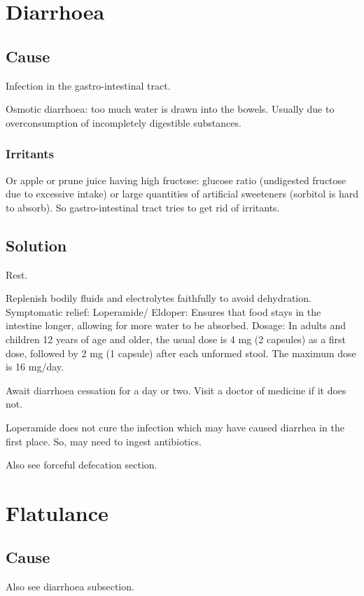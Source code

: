 \documentclass[oneside, article]{memoir}
\begin{document}
\section{Diarrhoea}
\subsection{Cause}
Infection in the gastro-intestinal tract.

Osmotic diarrhoea: too much water is drawn into the bowels. Usually due to overconsumption of incompletely digestible substances. 

\subsubsection{Irritants}
Or apple or prune juice having high fructose: glucose ratio (undigested fructose due to excessive intake) or large quantities of artificial sweeteners (sorbitol is hard to absorb). So gastro-intestinal tract tries to get rid of irritants.

\subsection{Solution}
Rest.

Replenish bodily fluids and electrolytes faithfully to avoid dehydration. Symptomatic relief: Loperamide/ Eldoper: Ensures that food stays in the intestine longer, allowing for more water to be absorbed. Dosage: In adults and children 12 years of age and older, the usual dose is 4 mg (2 capsules) as a first dose, followed by 2 mg (1 capsule) after each unformed stool. The maximum dose is 16 mg/day.

Await diarrhoea cessation for a day or two. Visit a doctor of medicine if it does not.

Loperamide does not cure the infection which may have caused diarrhea in the first place. So, may need to ingest antibiotics.

Also see forceful defecation section.



\section{Flatulance}
\subsection{Cause}
Also see diarrhoea subsection.
\end{document}
